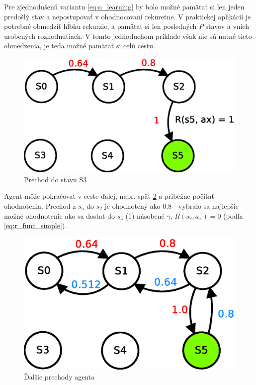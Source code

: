 Pre zjednodušenú variantu \ref{eq:q_learning} by bolo možné pamätať si len jeden
predošlý stav a nepostupovať v ohodnocovaní rekuretne. V praktickej aplikácií
je potrebné obmedziť hĺbku rekurzie, a pamätať si len posledných $P$ stavov a vnich
urobených rozhodnutiach. V tomto jedńoduchom príklade však nie sú nutné tieto obmedzenia, je teda
možné pamätať si celú cestu.

\begin{figure}[!htb]
\center
\includegraphics[scale=.6]{../diagrams/q_learning_table_04.eps}
\caption{Prechod do stavu S3}
\label{img:q_learning_4}
\end{figure}

Agent môže pokračovať v ceste ďalej, napr. späť \ref{img:q_learning_5} a pribežne
počítať ohodnotenia. Prechod z $s_5$ do $s_2$ je ohodnotený ako $0.8$ - vybralo sa najlepšie
možné ohodnotenie ako sa dostať do $s_5$ ($1$) násobené $\gamma$, $R(s_2, a_x) = 0$
(podľa \ref{eq:r_func_simple}).


\begin{figure}[!htb]
\center
\includegraphics[scale=.6]{../diagrams/q_learning_table_05.eps}
\caption{Ďalšie prechody agenta}
\label{img:q_learning_5}
\end{figure}

